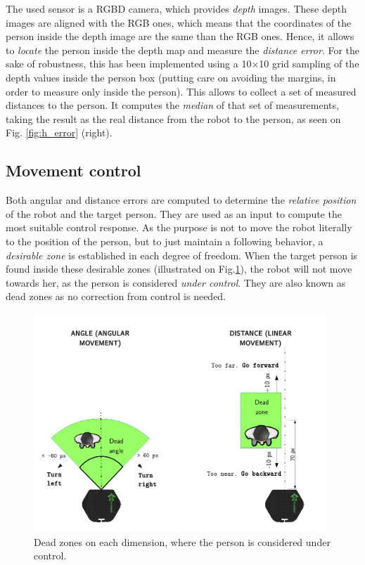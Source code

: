 The used sensor is a RGBD camera, which provides \emph{depth} images. These depth images are aligned with the RGB ones, which means that the coordinates of the person inside the depth image are the same than the RGB ones. Hence, it allows to \emph{locate} the person inside the depth map and measure the \emph{distance error}. For the sake of robustness, this has been implemented using a 10$\times$10 grid sampling of the depth values inside the person box (putting care on avoiding the margins, in order to measure only inside the person). This allows to collect a set of measured distances to the person. It computes the \emph{median} of that set of measurements, taking the result as the real distance from the robot to the person, as seen on Fig. \ref{fig:h_error} (right). 

\subsection{Movement control}

Both angular and distance errors are computed to determine the \emph{relative position} of the robot and the target person. They are used as an input to compute the most suitable control response. As the purpose is not to move the robot literally to the position of the person, but to just maintain a following behavior, a \emph{desirable zone} is established in each degree of freedom. When the target person is found inside these desirable zones (illustrated on Fig.\ref{fig:dead_zones}), the robot will not move towards her, as the person is considered \emph{under control}. They are also known as dead zones as no correction from control is needed. 

\begin{figure}[h]
	\centering
	\includegraphics[width=11cm]{images/dead_zones}
	\caption{Dead zones on each dimension, where the person is considered under control.}
	\label{fig:dead_zones}
\end{figure}

